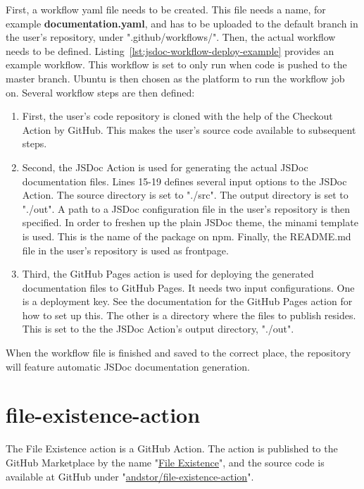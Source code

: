 First, a workflow yaml file needs to be created. This file needs a name, for example \textbf{documentation.yaml}, and has to be uploaded to the default branch in the user's repository, under ".github/workflows/". Then, the actual workflow needs to be defined. Listing~\ref{lst:jsdoc-workflow-deploy-example} provides an example workflow. This workflow is set to only run when code is pushed to the master branch. Ubuntu is then chosen as the platform to run the workflow job on. Several workflow steps are then defined:
\begin{enumerate}
    \item First, the user's code repository is cloned with the help of the Checkout Action by GitHub. This makes the user's source code available to subsequent steps. 
    \item Second, the JSDoc Action is used for generating the actual JSDoc documentation files. Lines 15-19 defines several input options to the JSDoc Action. The source directory is set to "./src". The output directory is set to "./out". A path to a JSDoc configuration file in the user's repository is then specified. In order to freshen up the plain JSDoc theme, the minami template is used. This is the name of the package on npm. Finally, the README.md file in the user's repository is used as frontpage. 
    \item Third, the GitHub Pages action is used for deploying the generated documentation files to GitHub Pages. It needs two input configurations. One is a deployment key. See the documentation for the GitHub Pages action for how to set up this. The other is a directory where the files to publish resides. This is set to the the JSDoc Action's output directory, "./out".
\end{enumerate}
When the workflow file is finished and saved to the correct place, the repository will feature automatic JSDoc documentation generation.

\clearpage


\section{file-existence-action}
The File Existence action is a GitHub Action. The action is published to the GitHub Marketplace by the name "\href{https://github.com/marketplace/actions/file-existence}{File Existence}", and the source code is available at GitHub under "\href{https://github.com/andstor/file-existence-action}{andstor/file-existence-action}".

